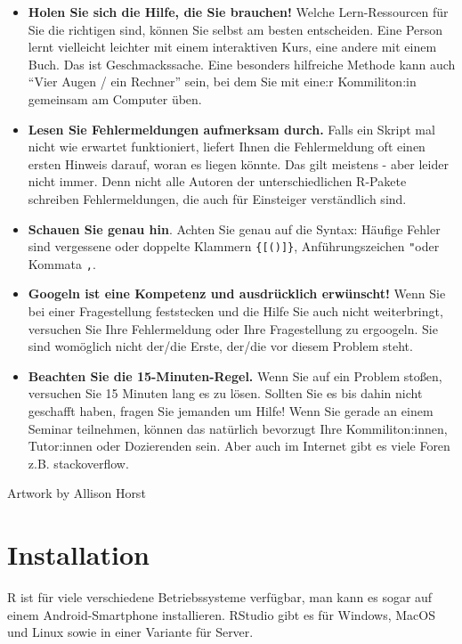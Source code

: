\documentclass[
]{book}
\begin{document}
\begin{itemize}
\item
  \textbf{Holen Sie sich die Hilfe, die Sie brauchen!}
  Welche Lern-Ressourcen für Sie die richtigen sind, können Sie selbst am besten entscheiden. Eine Person lernt vielleicht leichter mit einem interaktiven Kurs, eine andere mit einem Buch. Das ist Geschmackssache. Eine besonders hilfreiche Methode kann auch ``Vier Augen / ein Rechner'' sein, bei dem Sie mit eine:r Kommiliton:in gemeinsam am Computer üben.
\item
  \textbf{Lesen Sie Fehlermeldungen aufmerksam durch.}
  Falls ein Skript mal nicht wie erwartet funktioniert, liefert Ihnen die Fehlermeldung oft einen ersten Hinweis darauf, woran es liegen könnte. Das gilt meistens - aber leider nicht immer. Denn nicht alle Autoren der unterschiedlichen R-Pakete schreiben Fehlermeldungen, die auch für Einsteiger verständlich sind.
\item
  \textbf{Schauen Sie genau hin}.
  Achten Sie genau auf die Syntax: Häufige Fehler sind vergessene oder doppelte Klammern \texttt{\{{[}(){]}\}}, Anführungszeichen \texttt{"}oder Kommata \texttt{,}.
\item
  \textbf{Googeln ist eine Kompetenz und ausdrücklich erwünscht!}
  Wenn Sie bei einer Fragestellung feststecken und die Hilfe Sie auch nicht weiterbringt, versuchen Sie Ihre Fehlermeldung oder Ihre Fragestellung zu ergoogeln. Sie sind womöglich nicht der/die Erste, der/die vor diesem Problem steht.
\item
  \textbf{Beachten Sie die 15-Minuten-Regel.}
  Wenn Sie auf ein Problem stoßen, versuchen Sie 15 Minuten lang es zu lösen. Sollten Sie es bis dahin nicht geschafft haben, fragen Sie jemanden um Hilfe! Wenn Sie gerade an einem Seminar teilnehmen, können das natürlich bevorzugt Ihre Kommiliton:innen, Tutor:innen oder Dozierenden sein. Aber auch im Internet gibt es viele Foren z.B. stackoverflow.
\end{itemize}

Artwork by Allison Horst

\hypertarget{installation}{%
\chapter{Installation}\label{installation}}

R ist für viele verschiedene Betriebssysteme verfügbar, man kann es sogar auf einem Android-Smartphone installieren. RStudio gibt es für Windows, MacOS und Linux sowie in einer Variante für Server.
\end{document}
